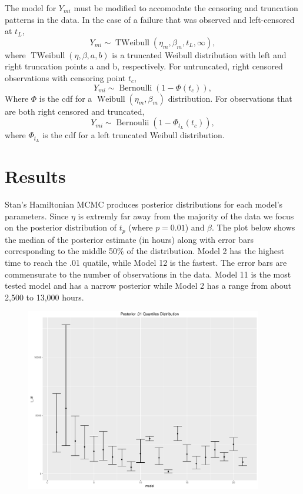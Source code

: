 \documentclass{scrartcl}
\begin{document}
The model for $Y_{mi}$ must be modified to accomodate the censoring and truncation patterns in the data. In the case of a failure that was observed and left-censored at $t_L$,
\[Y_{mi} \sim \operatorname{TWeibull}(\eta_m, \beta_m, t_L, \infty),\]
where $\operatorname{TWeibull}(\eta,\beta,a,b)$ is a truncated Weibull distribution with left and right truncation points a and b, respectively. For untruncated, right censored observations with censoring point $t_c$,
\[Y_{mi} \sim \operatorname{Bernoulli}(1-\Phi(t_c)),\]
Where $\Phi$ is the cdf for a $\operatorname{Weibull}(\eta_m,\beta_m)$ distribution.
For observations that are both right censored and truncated,
\[Y_{mi} \sim \operatorname{Bernoulii}(1-\Phi_{t_L}(t_c)),\]
where $\Phi_{t_L}$ is the cdf for a left truncated Weibull distribution. 

\section*{Results}
Stan's Hamiltonian MCMC produces posterior distributions for each model's parameters.  Since $\eta$ is extremly far away from the majority of the data we focus on the posterior distribution of $t_p$ (where $p=0.01$) and $\beta$.  The plot below shows the median of the posterior estimate (in hours) along with error bars corresponding to the middle 50\% of the distribution.  Model 2 has the highest time to reach the .01 quatile, while Model 12 is the fastest.  The error bars are commensurate to the number of observations in the data.  Model 11 is the most tested model and has a narrow posterior while Model 2 has a range from about 2,500 to 13,000 hours.
\begin{figure}[H]
\centering
\includegraphics[height=8cm]{postquant.pdf}
\end{figure}
\end{document}
